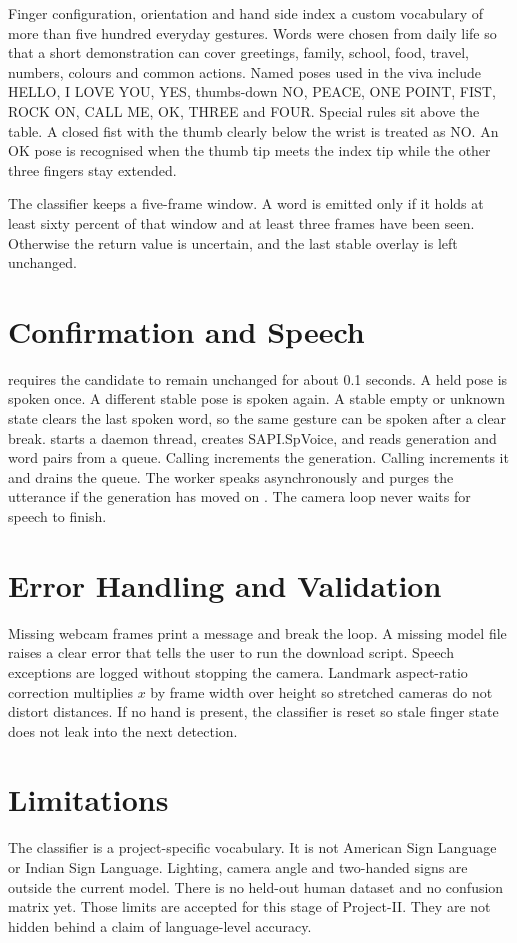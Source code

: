 Finger configuration, orientation and hand side index a custom vocabulary of more than five hundred everyday gestures. Words were chosen from daily life so that a short demonstration can cover greetings, family, school, food, travel, numbers, colours and common actions. Named poses used in the viva include HELLO, I LOVE YOU, YES, thumbs-down NO, PEACE, ONE POINT, FIST, ROCK ON, CALL ME, OK, THREE and FOUR. Special rules sit above the table. A closed fist with the thumb clearly below the wrist is treated as NO. An OK pose is recognised when the thumb tip meets the index tip while the other three fingers stay extended.

The classifier keeps a five-frame window. A word is emitted only if it holds at least sixty percent of that window and at least three frames have been seen. Otherwise the return value is uncertain, and the last stable overlay is left unchanged.

\section{Confirmation and Speech}
 requires the candidate to remain unchanged for about 0.1 seconds. A held pose is spoken once. A different stable pose is spoken again. A stable empty or unknown state clears the last spoken word, so the same gesture can be spoken after a clear break.  starts a daemon thread, creates SAPI.SpVoice, and reads generation and word pairs from a queue. Calling  increments the generation. Calling  increments it and drains the queue. The worker speaks asynchronously and purges the utterance if the generation has moved on \cite{sapi}. The camera loop never waits for speech to finish.

\section{Error Handling and Validation}
Missing webcam frames print a message and break the loop. A missing model file raises a clear error that tells the user to run the download script. Speech exceptions are logged without stopping the camera. Landmark aspect-ratio correction multiplies $x$ by frame width over height so stretched cameras do not distort distances. If no hand is present, the classifier is reset so stale finger state does not leak into the next detection.

\section{Limitations}
The classifier is a project-specific vocabulary. It is not American Sign Language or Indian Sign Language. Lighting, camera angle and two-handed signs are outside the current model. There is no held-out human dataset and no confusion matrix yet. Those limits are accepted for this stage of Project-II. They are not hidden behind a claim of language-level accuracy.

